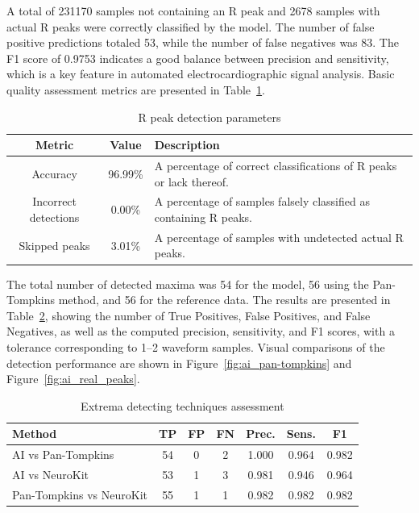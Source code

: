 \documentclass{citask}
\begin{document}
A total of 231170 samples not containing an R peak and 2678 samples with actual R peaks were correctly classified by the model. The number of false positive predictions totaled 53, while the number of false negatives was 83. The F1 score of 0.9753 indicates a good balance between precision and sensitivity, which is a key feature in automated electrocardiographic signal analysis. Basic quality assessment metrics are presented in Table~\ref{tab:metrics}.

\begin{table}[ht]
\centering
\caption{R peak detection parameters}
\label{tab:metrics}
\begin{tabular}{|c|c|p{4.6cm}|}
\hline
\textbf{Metric} & \textbf{Value} & \textbf{Description} \\
\hline
Accuracy & 96.99\% & A percentage of correct classifications of R peaks or lack thereof. \\
Incorrect detections & 0.00\% & A percentage of samples falsely classified as containing R peaks. \\
Skipped peaks & 3.01\% & A percentage of samples with undetected actual R peaks. \\
\hline
\end{tabular}
\end{table}

The total number of detected maxima was 54 for the model, 56 using the Pan-Tompkins method, and 56 for the reference data. The results are presented in Table~\ref{tab:peak_comparison}, showing the number of True Positives, False Positives, and False Negatives, as well as the computed precision, sensitivity, and F1 scores, with a tolerance corresponding to 1–2 waveform samples. Visual comparisons of the detection performance are shown in Figure~\ref{fig:ai_pan-tompkins} and Figure~\ref{fig:ai_real_peaks}.

\begin{table}[ht]
\caption{Extrema detecting techniques assessment}
\label{tab:peak_comparison}
\centering
\begin{tabular}{|p{3.08cm}|c|c|c|c|c|c|}
\hline
\textbf{Method} & \textbf{TP} & \textbf{FP} & \textbf{FN} & \textbf{Prec.} & \textbf{Sens.} & \textbf{F1} \\
\hline
AI vs Pan-Tompkins & 54 & 0 & 2 & 1.000 & 0.964 & 0.982 \\
AI vs NeuroKit & 53 & 1 & 3 & 0.981 & 0.946 & 0.964 \\
Pan-Tompkins vs NeuroKit & 55 & 1 & 1 & 0.982 & 0.982 & 0.982 \\
\hline
\end{tabular}
\end{table}
\end{document}
